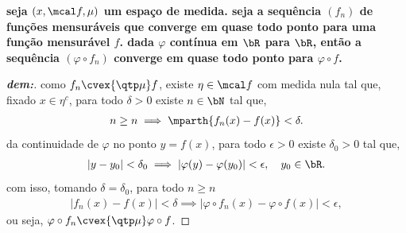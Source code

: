 \textbf{seja $(x, \mcal f, \mu)$ um espaço de medida. seja a sequência 
$(f_n)$ de funções mensuráveis que converge em quase todo ponto para 
uma função mensurável $f$. dada $\varphi$ contínua em $\bR$ para $\bR$, 
então a sequência $(\varphi \circ f_n)$ converge em quase todo ponto para 
$\varphi \circ f$.}
\begin{proof}[\textbf{dem:}] como $f_n \cvex{\qtp \mu} f$,
  existe $\eta \in \mcal f$ com medida nula tal que, fixado $x \in \eta^c$, 
  para todo $\delta > 0$ existe $n \in \bN$ tal que, 
  \begin{align*}
    n \ge n \implies \mparth{f_n(x) - f(x)}< \delta.
  \end{align*}
  da continuidade de $\varphi$ no ponto $y = f(x)$, 
  para todo $\epsilon > 0$ 
  existe $\delta_0 > 0$ tal que,
  \begin{align*}
    |y - y_0 | < \delta_0 \implies |\varphi(y) - \varphi(y_0)|< \epsilon,
    \quad y_0\in \bR.
  \end{align*}
  com isso, tomando $\delta = \delta_0$, para todo $n \ge n$
  \begin{align*}
    |f_n(x) - f(x)| < \delta \implies |\varphi \circ f_n (x) - 
    \varphi \circ f(x)| <\epsilon,
  \end{align*}
  ou seja, $\varphi \circ f_n \cvex {\qtp \mu} \varphi \circ f$.
\end{proof}

